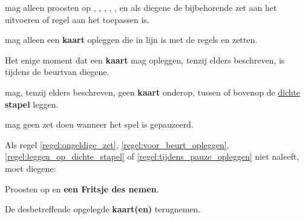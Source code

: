 
\vervolgLijst{}
\item \EenSpeler mag alleen proosten op , , , , ,  en  als diegene de bijbehorende zet aan het uitvoeren of regel aan het toepassen is\footnotemark[4].
\eindLijst{}



\newpage
{}


\vervolgLijst{}
\item \EenSpeler mag alleen een \textbf{kaart} opleggen die in lijn is met de regels en zetten.
\label{regel:ongeldige_zet}
\eindLijst{}

\vervolgLijst{}
\item Het enige moment dat \eenSpeler een \textbf{kaart} mag opleggen, tenzij elders beschreven, is tijdens de beurt\footnotemark[1] van diegene.
\label{regel:voor_beurt_opleggen}
\eindLijst{}

\vervolgLijst{}
\item \EenSpeler mag, tenzij elders beschreven, geen \textbf{kaart} onderop, tussen of bovenop de \ul{dichte} \textbf{stapel} leggen.
\label{regel:leggen_op_dichte_stapel}
\eindLijst{}

\vervolgLijst{}
\item \EenSpeler mag geen zet doen wanneer het spel is gepauzeerd\footnotemark[2].
\label{regel:tijdens_pauze_opleggen}
\eindLijst{}

\vervolgLijst{}
\item Als \eenSpeler regel \ref{regel:ongeldige_zet}, \ref{regel:voor_beurt_opleggen}, \ref{regel:leggen_op_dichte_stapel} of \ref{regel:tijdens_pauze_opleggen} niet naleeft, moet diegene:
\puntLijst{}
\item Proosten op  en \textbf{een Fritsje des nemen}\footnotemark[3].
\item De desbetreffende opgelegde \textbf{kaart(en)} terugnemen.
\eindPuntLijst{}
\label{regel:kaarten_terugnemen_2}
\eindLijst{}

